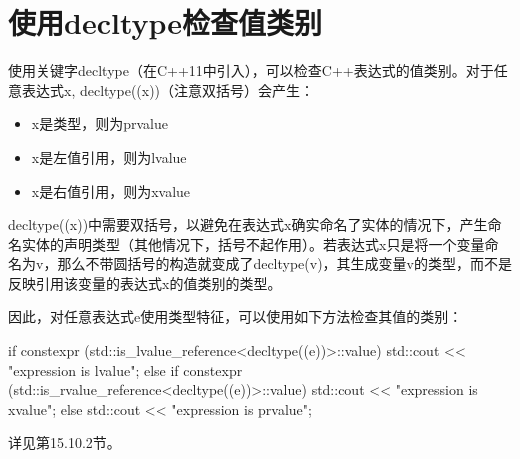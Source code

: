 \section{使用decltype检查值类别}
使用关键字decltype（在C++11中引入），可以检查C++表达式的值类别。对于任意表达式x, decltype((x))（注意双括号）会产生：

\begin{itemize}
\item 
x是类型，则为prvalue

\item
x是左值引用，则为lvalue

\item
x是右值引用，则为xvalue
\end{itemize}

decltype((x))中需要双括号，以避免在表达式x确实命名了实体的情况下，产生命名实体的声明类型（其他情况下，括号不起作用）。若表达式x只是将一个变量命名为v，那么不带圆括号的构造就变成了decltype(v)，其生成变量v的类型，而不是反映引用该变量的表达式x的值类别的类型。

因此，对任意表达式e使用类型特征，可以使用如下方法检查其值的类别：

\begin{cpp}
if constexpr (std::is_lvalue_reference<decltype((e))>::value) {
	std::cout << "expression is lvalue\n";
}
else if constexpr (std::is_rvalue_reference<decltype((e))>::value) {
	std::cout << "expression is xvalue\n";
}
else {
	std::cout << "expression is prvalue\n";
}
\end{cpp}

详见第15.10.2节。







